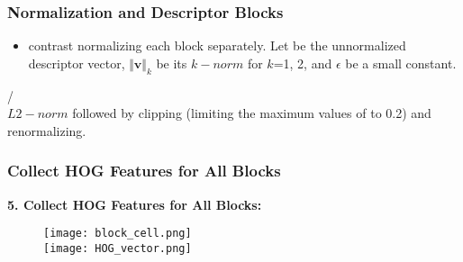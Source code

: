 \documentclass[notheorems,serif,table,compress]{beamer}  %
\begin{document}
\begin{frame}        
\frametitle{Normalization and Descriptor Blocks}
\begin{itemize}
        \item contrast normalizing each block separately. Let \textbf{} be the unnormalized descriptor vector, $\Vert \mathbf{v} \Vert_k$ be its $k-norm$ for $k$=1, 2, and
$\epsilon$ be a small constant.\\
\end{itemize}
 \textbf{}\to  {}/\\
 $L2-norm$ followed by clipping (limiting the maximum values of  to 0.2) and renormalizing.\\
 \textbf{}\to  {}
\end{frame}

\begin{frame}        
\frametitle{Collect HOG Features for All Blocks}
\textbf{\color{blue}5. Collect HOG Features for All Blocks: }
\begin{figure}
    \texttt{[image: block\_cell.png]}\\
    \texttt{[image: HOG\_vector.png]}
\end{figure}   
\end{frame}
   
\end{document}
